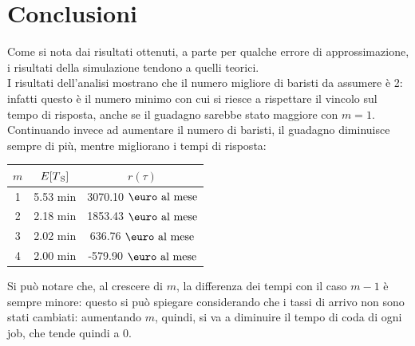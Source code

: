 \documentclass[a4paper, 12pt]{article}
\begin{document}
\section{Conclusioni}
Come si nota dai risultati ottenuti, a parte per qualche errore di
approssimazione, i risultati della simulazione tendono a quelli
teorici.\\
I risultati dell'analisi mostrano che il numero migliore di baristi da assumere
è 2: infatti questo è il numero minimo con cui si riesce a rispettare il
vincolo sul tempo di risposta, anche se il guadagno sarebbe stato maggiore con
$m = 1$. Continuando invece ad aumentare il numero di baristi, il guadagno
diminuisce sempre di più, mentre migliorano i tempi di risposta:
\bigskip 
\begin{center}
\begin{tabular}{ |c|c|c| }
  \hline
  $m$ & $E[T\textsubscript{S}]$ & $r(\tau)$ \\
  \hline
  \hline
  1 & 5.53 min & 3070.10 $\mbox{\euro}\text{ al mese}$ \\
  \hline
  2 & 2.18 min & 1853.43 $\mbox{\euro}\text{ al mese}$ \\
  \hline
  3 & 2.02 min & 636.76 $\mbox{\euro}\text{ al mese}$ \\
  \hline
  4 & 2.00 min & -579.90 $\mbox{\euro}\text{ al mese}$ \\
  \hline
\end{tabular}
\end{center}

Si può notare che, al crescere di $m$, la differenza dei tempi con il caso $m
- 1$ è sempre minore: questo si può spiegare considerando che i tassi di arrivo
non sono stati cambiati: aumentando $m$, quindi, si va a diminuire il tempo di
coda di ogni job, che tende quindi a 0.
\end{document}
